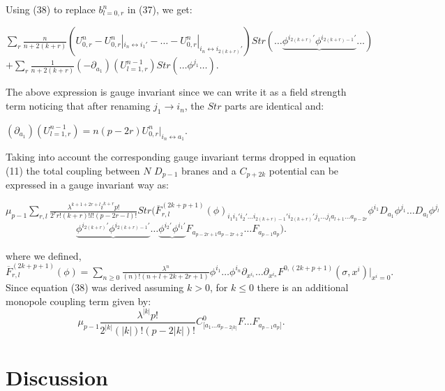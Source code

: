 \documentclass[a4paper,12pt]{article}
\begin{document}
Using  (38) to replace $b^n_{l=0,r}$ in (37), we get:
\begin{center}
$\sum_r\frac{n}{n+2(k+r)}(U^n_{0,r}-U^n_{0,r}|_{i_n\leftrightarrow i_1'}-\ldots -U^n_{0,r}|_{i_n\leftrightarrow i_{2(k+r)}'})Str\left(\ldots \underbrace{\phi^{i_{2(k+r)}'}\phi^{i_{2(k+r)-1}'}}\ldots \right)$ \newline
$+\sum_r\frac{1}{n+2(k+r)}(-\partial_{a_1})(U^{n-1}_{l=1,r})Str\left(\ldots \phi^{j_1}\ldots \right)$.
\end{center}
The above expression is gauge invariant since we can write it as a field strength term noticing that after renaming $j_1\rightarrow i_n$, the $Str$ parts are identical and:
\begin{center}
$(\partial_{a_1})(U^{n-1}_{l=1,r})= n(p-2r)U^n_{0,r}|_{i_n\leftrightarrow a_1}$.
\end{center}
Taking into account the corresponding gauge invariant terms dropped in equation (11) the total coupling between $N$ $D_{p-1}$ branes and a $C_{p+2k}$ potential can be expressed in a gauge invariant way as:
\begin{center}
$
\mu_{p-1}\sum_{r,l}\frac{\lambda^{k+1+2r+l}i^{k+r}p!}{2^r r!(k+r)!l!(p-2r-l)!}
Str(\overline{F}_{r,l}^{(2k+p+1)}(\phi)_{i_1i_1'i_2'\ldots i_{2(k+r)-1}'i_{2(k+r)}'j_1\ldots j_la_{l+1}\ldots a_{p-2r}}\phi^{i_1}D_{a_1}\phi^{j_1}\ldots D_{a_l}\phi^{j_l}$
\begin{equation} 
\underbrace{\phi^{i_{2(k+r)}'}\phi^{i_{2(k+r)-1}'}}\ldots \underbrace{\phi^{i_2'}\phi^{i_1'}}F_{a_{p-2r+1}a_{p-2r+2}}\ldots F_{a_{p-1}a_p}).
\end{equation}
\end{center}
where we defined,\newline
\hspace*{1.5cm}$\overline{F}_{r,l}^{(2k+p+1)}(\phi)=\sum_{n\geq0} \frac {\lambda^n}{(n)!(n+l+2k+2r+1)} \phi^{i_1}\ldots \phi^{i_{n}} \partial_{x^{i_1}}\ldots \partial_{x^{i_{n}}} F^{0,(2k+p+1)}(\sigma,x^i)|_{x^i=0}.$ \newline
 Since equation (38) was derived assuming $k>0$, for $k\leq 0$  there is an additional monopole coupling term given by:
\begin{equation}
\mu_{p-1}\frac{\lambda^{|k|}p!}{2^{|k|}(|k|)!(p-2|k|)!}C^0_{[a_1\ldots a_{p-2|k|}}F\ldots F_{a_{p-1}a_p]}.
\end{equation}


\section{Discussion}
\end{document}
